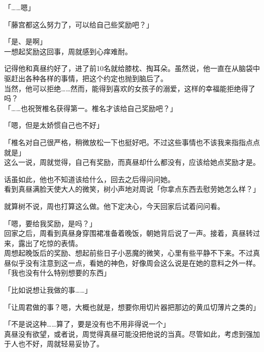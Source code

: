 「……嗯」

「藤宫都这么努力了，可以给自己些奖励吧？」

「是、是啊」\\

一想起奖励这回事，周就感到心痒难耐。

记得他和真昼约好了，进了前10名就给膝枕、掏耳朵。虽然说，他一直在从脑袋中驱赶出各种各样的事情，把这个约定也抛到脑后了。\\

当然，他可以拒绝……然而，能得到喜欢的女孩子的溺爱，这样的幸福能拒绝得了吗？\\

「……也祝贺椎名获得第一。椎名才该给自己奖励吧？」

「嗯，但是太娇惯自己也不好」

「椎名对自己很严格，稍微放松一下也挺好吧。不过这些事情也不该我来指指点点就是」\\

这么一说，周就觉得，自己有奖励，而真昼却什么都没有，应该给她点奖励才是。

话虽如此，他也不知道该给什么，回去之后得问问她。\\

看到真昼满脸天使大人的微笑，树小声地对周说「你拿点东西去慰劳她怎么样？」

就算树不说，周也打算这么做。他下定决心，今天回家后试着问问看。\\

\vspace{2\baselineskip}

「嗯，要给我奖励，是吗？」\\

回家之后，周看到真昼身穿围裙准备着晚饭，朝她背后说了一声。接着，真昼转过来，露出了吃惊的表情。\\

周想起晚饭后的奖励、想起前些日子小恶魔的微笑，心里有些平静不下来。不过真昼似乎没有注意到这一点，看她的神色，好像周会这么说是在她的意料之外一样。\\

「我也没有什么特别想要的东西」

「比如说想让我做的事……」

「让周君做的事？嗯，大概也就是，想要你用切片器把那边的黄瓜切薄片之类的」

「不是说这种……算了，要是没有也不用非得说一个」\\

真昼没有欲望，或者说，周觉得真昼可能没把他说的当真。尽管如此，考虑到强加于人也不好，周就轻易妥协了。\\


